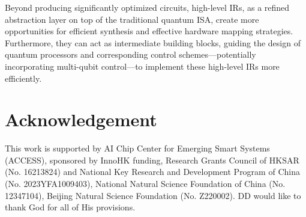 \documentclass[conference,9pt]{IEEEtran}
\newcommand{\DD}[1]{{\color{cyan}[DD: #1]}}
\begin{document}

Beyond producing significantly optimized circuits, high-level IRs, as a refined abstraction layer on top of the traditional quantum ISA, create more opportunities for efficient synthesis and effective hardware mapping strategies. Furthermore, they can act as intermediate building blocks, guiding the design of quantum processors and corresponding control schemes---potentially incorporating multi-qubit control---to implement these high-level IRs more efficiently.


\section*{Acknowledgement}
    This work is supported by AI Chip Center for Emerging Smart Systems (ACCESS), sponsored by InnoHK funding, Research Grants Council of HKSAR (No. 16213824) and National Key Research and Development Program of China (No. 2023YFA1009403), National Natural Science Foundation of China (No. 12347104), Beijing Natural Science Foundation (No. Z220002).
    DD would like to thank God for all of His provisions.









\end{document}
